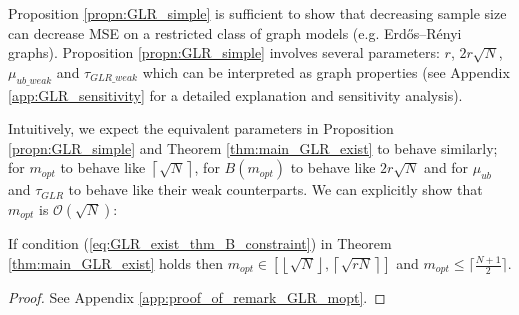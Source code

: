 {{Proposition \ref{propn:GLR_simple} is sufficient to show that decreasing sample size can decrease MSE on a restricted class of graph models (e.g. Erdős–Rényi graphs). 
Proposition \ref{propn:GLR_simple} involves several parameters: $r$, $2r\sqrt{N}$, $\mu_{ub\_weak}$ and $\tau_{GLR\_weak}$ which can be interpreted as graph properties (see Appendix \ref{app:GLR_sensitivity} for a detailed explanation and sensitivity analysis). 


Intuitively, we expect the equivalent parameters in Proposition \ref{propn:GLR_simple} and Theorem \ref{thm:main_GLR_exist} to behave similarly; for $m_{opt}$ to behave like $\left\lceil \sqrt{N} \right\rceil$, for $B(m_{opt})$ to behave like $2r\sqrt{N}$ and for $\mu_{ub}$ and $\tau_{GLR}$ to behave like their weak counterparts. We can explicitly show that $m_{opt}$ is $\mathcal{O}(\sqrt{N})$:

\begin{remark}
\label{remark:mopt}
If condition (\ref{eq:GLR_exist_thm_B_constraint}) in Theorem \ref{thm:main_GLR_exist} holds
    then $m_{opt} \in \left[\left\lfloor\sqrt{N}\right\rfloor, \left\lceil\sqrt{rN}\right\rceil \right]$ and $m_{opt} \leq \lceil\frac{N+1}{2}\rceil$.
\end{remark}
\begin{proof}
    See Appendix \ref{app:proof_of_remark_GLR_mopt}.
\end{proof}

}



}
